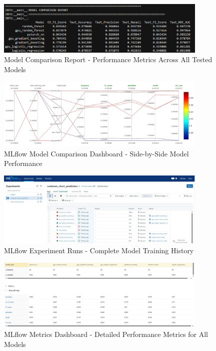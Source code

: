 \documentclass{article}
\begin{document}
\begin{figure}[H]
    \centering
    \includegraphics[width=0.9\textwidth]{Comparison.png}
    \caption{Model Comparison Report - Performance Metrics Across All Tested Models}
    \label{fig:model_comparison}
\end{figure}

\begin{figure}[H]
    \centering
    \includegraphics[width=0.9\textwidth]{Compare_mlflow.jpg}
    \caption{MLflow Model Comparison Dashboard - Side-by-Side Model Performance}
    \label{fig:mlflow_comparison}
\end{figure}



\begin{figure}[H]
    \centering
    \includegraphics[width=0.9\textwidth]{ML_flow_runs.jpg}
    \caption{MLflow Experiment Runs - Complete Model Training History}
    \label{fig:mlflow_runs}
\end{figure}

\begin{figure}[H]
    \centering
    \includegraphics[width=0.9\textwidth]{ML_flow_runs_metrices.jpg}
    \caption{MLflow Metrics Dashboard - Detailed Performance Metrics for All Models}
    \label{fig:mlflow_metrics}
\end{figure}
\end{document}
